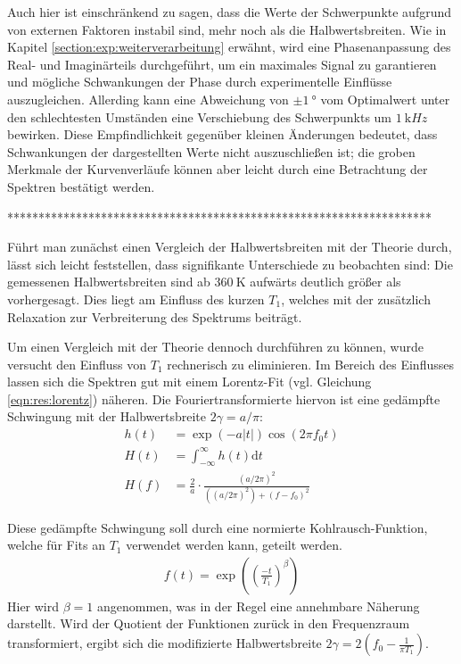 Auch hier ist einschränkend zu sagen, dass die Werte der Schwerpunkte aufgrund von externen Faktoren instabil sind, mehr noch als die Halbwertsbreiten. Wie in Kapitel \ref{section:exp:weiterverarbeitung} erwähnt, wird eine Phasenanpassung des Real- und Imaginärteils durchgeführt, um ein maximales Signal zu garantieren und mögliche Schwankungen der Phase durch experimentelle Einflüsse auszugleichen. Allerding kann eine Abweichung von $\pm \SI{1}{\degree}$ vom Optimalwert unter den schlechtesten Umständen eine Verschiebung des Schwerpunkts um $\SI{1}{\kilo Hz}$ bewirken. Diese Empfindlichkeit gegenüber kleinen Änderungen bedeutet, dass Schwankungen der dargestellten Werte nicht auszuschließen ist; die groben Merkmale der Kurvenverläufe können aber leicht durch eine Betrachtung der Spektren bestätigt werden.




********************************************************************




Führt man zunächst einen Vergleich der Halbwertsbreiten mit der Theorie durch, lässt sich leicht feststellen, dass signifikante Unterschiede zu beobachten sind: Die gemessenen Halbwertsbreiten sind ab $\SI{360}{\kelvin}$ aufwärts deutlich größer als vorhergesagt. Dies liegt am Einfluss des kurzen $T_1$, welches mit der zusätzlich Relaxation zur Verbreiterung des Spektrums beiträgt.

Um einen Vergleich mit der Theorie dennoch durchführen zu können, wurde versucht den Einfluss von $T_1$ rechnerisch zu eliminieren. Im Bereich des Einflusses lassen sich die Spektren gut mit einem Lorentz-Fit (vgl. Gleichung \eqref{eqn:res:lorentz}) näheren. Die Fouriertransformierte hiervon ist eine gedämpfte Schwingung mit der Halbwertsbreite $2 \gamma = a/\pi$:
\begin{align}
	h(t) &= \exp{(-a |t|)} \cos{(2 \pi f_0 t)}      \\
	H(t) &= \int_{-\infty}^{\infty} h(t) \text{d} t \\
	H(f) &= \frac{2}{a} \cdot \frac{(a/2\pi)^2}{((a/2\pi)^2) + (f - f_0)^2}
\end{align}

Diese gedämpfte Schwingung soll durch eine normierte Kohlrausch-Funktion, welche für Fits an $T_1$ verwendet werden kann, geteilt werden.
\begin{align}
	f(t) = \exp{\left( {\left(\frac{-t}{T_1} \right)}^\beta \right) }
\end{align}
Hier wird $\beta = 1$ angenommen, was in der Regel eine annehmbare Näherung darstellt. Wird der Quotient der Funktionen zurück in den Frequenzraum transformiert, ergibt sich die modifizierte Halbwertsbreite $2\gamma = 2(f_0 - \frac{1}{\pi T_1})$.

